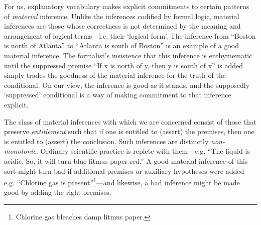 \documentclass{svjour3}                     %
\begin{document}
For us, explanatory vocabulary makes explicit commitments to certain patterns of \textit{material} inference. Unlike the inferences codified by formal logic, material inferences are those whose correctness is not determined by the meaning and arrangement of logical terms---i.e. their `logical form'. The inference from ``Boston is north of Atlanta'' to ``Atlanta is south of Boston'' is an example of a good material inference. The formalist's insistence that this inference is enthymematic until the suppressed premise ``If x is north of y, then y is south of x'' is added simply trades the goodness of the material inference for the truth of the conditional. On our view, the inference is good as it stands, and the supposedly `suppressed' conditional is a way of making commitment to that inference explicit. 

The class of material inferences with which we are concerned consist of those that preserve \textit{entitlement} such that if one is entitled to (assert) the premises, then one is entitled to (assert) the conclusion. Such inferences are distinctly \textit{non-monotonic}. Ordinary scientific practice is replete with them---e.g. ``The liquid is acidic. So, it will turn blue litmus paper red.'' A good material inference of this sort might turn bad if additional premises or auxiliary hypotheses were added---e.g. ``Chlorine gas is present''\footnote{Chlorine gas bleaches damp litmus paper.}---and likewise, a bad inference might be made good by adding the right premises.
\end{document}
